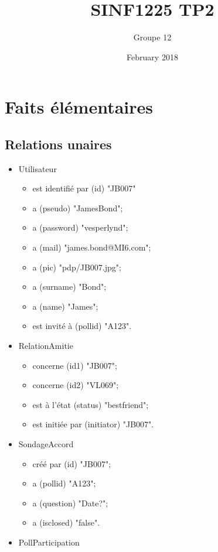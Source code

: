 \documentclass{article}
\title{SINF1225 TP2}
\author{Groupe 12}
\date{February 2018}
\begin{document}
\maketitle

\section{Faits élémentaires}

\subsection{Relations unaires}

\begin{itemize}
    \item Utilisateur
        \begin{itemize}
        \item est identifié par (id) "JB007"
        \item a (pseudo) "JamesBond";
        \item a (password) "vesperlynd";
        \item a (mail) "james.bond@MI6.com";
        \item a (pic) "pdp/JB007.jpg";
        \item a (surname) "Bond";
        \item a (name) "James";
        \item est invité à (pollid) "A123".
    \end{itemize}
    \item RelationAmitie
    \begin{itemize}
        \item concerne (id1) "JB007";
        \item concerne (id2) "VL069";
        \item est à l'état (status) "bestfriend";
        \item est initiée par (initiator) "JB007".
    \end{itemize}
    \item SondageAccord
    \begin{itemize}
        \item créé par (id) "JB007";
        \item a (pollid) "A123";
        \item a (question) "Date?";
        \item a (isclosed) "false".
    \end{itemize}
    \item PollParticipation

\end{itemize}
\end{document}
